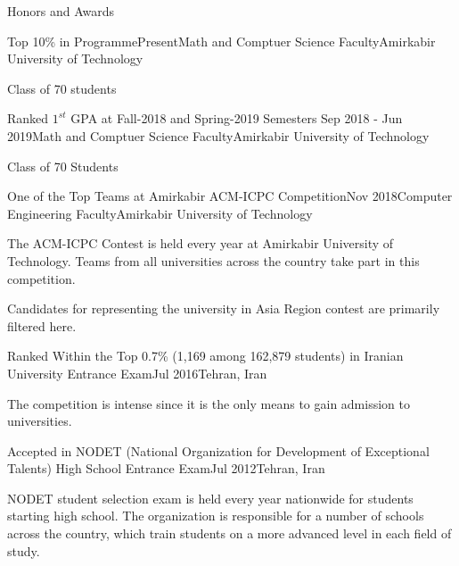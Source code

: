 \documentclass{resume} %
\begin{document}
	\begin{rSection}{Honors and Awards}
		\begin{rSubsection}{Top 10\% in Programme}{Present}{Math and Comptuer Science Faculty}{Amirkabir University of Technology}
			\item Class of 70 students
		\end{rSubsection}
		
		\begin{rSubsection}{Ranked $1^{st}$ GPA at Fall-2018 and Spring-2019 Semesters }{Sep 2018 - Jun 2019}{Math and Comptuer Science Faculty}{Amirkabir University of Technology}
			\item Class of 70 Students
		\end{rSubsection}	
		
		\begin{rSubsection}{One of the Top Teams at Amirkabir ACM-ICPC Competition}{Nov 2018}{Computer Engineering Faculty}{Amirkabir University of Technology}
			\item The ACM-ICPC Contest is held every year at Amirkabir University of Technology. Teams from all universities across the country take part in this competition.
			\item Candidates for representing the university in Asia Region contest are primarily filtered here.
		\end{rSubsection}
		
		\begin{rSubsection}{Ranked Within the Top 0.7\% (1,169 among 162,879 students) in Iranian University Entrance Exam}{Jul 2016}{Tehran, Iran }{ }
			\item The competition is intense since it is the only means to gain admission to universities.
		\end{rSubsection} 
		
		\begin{rSubsection}{Accepted in NODET (National Organization for Development of Exceptional Talents) High School Entrance Exam}{Jul 2012}{Tehran, Iran }{ }
			\item NODET student selection exam is held every year nationwide for students starting high school. The organization is responsible for a number of schools across the country, which train students on a more advanced level in each field of study.
		\end{rSubsection}
		
	\end{rSection}
\end{document}
